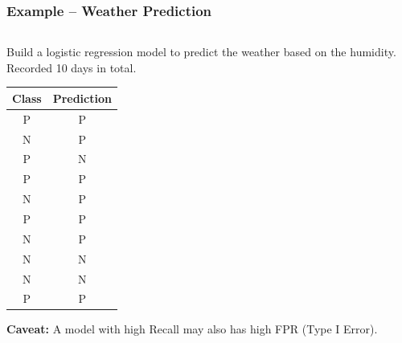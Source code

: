 \documentclass[aspectratio=169, 10pt]{beamer}
\begin{document}
\begin{frame}
    \frametitle{Example -- Weather Prediction}
    \begin{columns}
        \begin{column}{0.5\textwidth}
            Build a logistic regression model to predict the weather based on the humidity. \\
            Recorded 10 days in total.
            \begin{table}[]
                \begin{tabular}{cc}
                \textbf{Class} & \textbf{Prediction} \\ \hline
                P              & P                   \\
                N              & P                   \\
                P              & N                   \\
                P              & P                   \\
                N              & P                   \\
                P              & P                   \\
                N              & P                   \\
                N              & N                   \\
                N              & N                   \\
                P              & P                  
                \end{tabular}
            \end{table}

            \textbf{Caveat:} A model with high Recall may also has high FPR (Type I Error).


\end{column}
\end{columns}
\end{frame}
\end{document}
